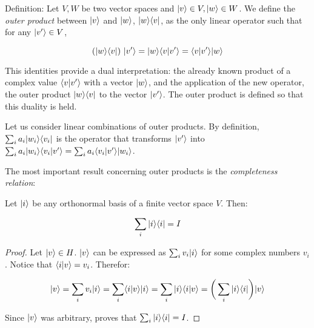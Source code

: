 \begin{definition}
	Definition: Let $V, W$ be two vector spaces and $|v\rangle \in V, |w\rangle \in W$. We define the \emph{outer product} between $|v\rangle$ and $|w\rangle$, $|w\rangle\langle v|$, as the only linear operator such that for any $|v'\rangle \in V$, 
	
	$$ (|w\rangle\langle v|) \ |v'\rangle = |w\rangle\langle v|v'\rangle = \langle v|v'\rangle |w\rangle$$
\end{definition}

This identities provide a dual interpretation: the already known product of a complex value $\langle v|v'\rangle$ with a vector $|w\rangle$, and the application of the new operator, the outer product $|w\rangle\langle v|$ to the vector $|v'\rangle$. The outer product is defined so that this duality is held.

Let us consider linear combinations of outer products. By definition, $\sum_i a_i |w_i\rangle\langle v_i|$ is the operator that transforms $|v'\rangle$ into $\sum_i a_i |w_i\rangle\langle v_i|v'\rangle = \sum_i a_i \langle v_i|v'\rangle |w_i\rangle$.

The most important result concerning outer products is the \emph{completeness relation}:

\begin{proposition}
	Let $|i\rangle$ be any orthonormal basis of a finite vector space $V$. Then:
	
	$$ \sum_i |i\rangle\langle i| = I $$
\end{proposition}

\begin{proof}
	Let $|v\rangle \in H$. $|v\rangle$ can be expressed as $ \sum_i v_i |i\rangle$ for some complex numbers $v_i$. Notice that $\langle i|v\rangle = v_i$. Therefor:
	
	$$|v\rangle = \sum_i v_i |i\rangle = \sum_i \langle i|v\rangle |i\rangle = \sum_i |i\rangle\langle i|v\rangle = \bigg( \sum_i |i\rangle\langle i|\bigg) |v\rangle$$
	
	Since $|v\rangle$ was arbitrary, proves that $ \sum_i |i\rangle\langle i | = I $.
\end{proof}

